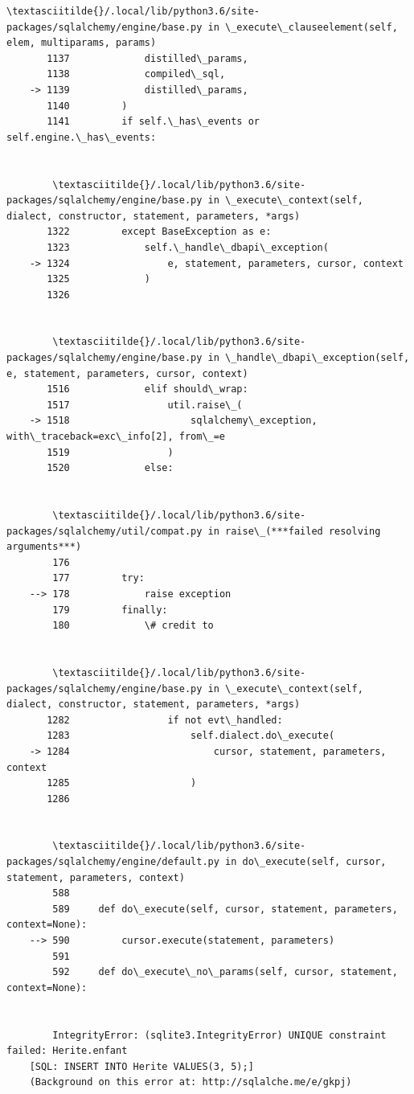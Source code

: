 \documentclass[11pt]{article}
\begin{document}
\begin{Verbatim}[commandchars=\\\{\}]
        \textasciitilde{}/.local/lib/python3.6/site-packages/sqlalchemy/engine/base.py in \_execute\_clauseelement(self, elem, multiparams, params)
       1137             distilled\_params,
       1138             compiled\_sql,
    -> 1139             distilled\_params,
       1140         )
       1141         if self.\_has\_events or self.engine.\_has\_events:


        \textasciitilde{}/.local/lib/python3.6/site-packages/sqlalchemy/engine/base.py in \_execute\_context(self, dialect, constructor, statement, parameters, *args)
       1322         except BaseException as e:
       1323             self.\_handle\_dbapi\_exception(
    -> 1324                 e, statement, parameters, cursor, context
       1325             )
       1326 


        \textasciitilde{}/.local/lib/python3.6/site-packages/sqlalchemy/engine/base.py in \_handle\_dbapi\_exception(self, e, statement, parameters, cursor, context)
       1516             elif should\_wrap:
       1517                 util.raise\_(
    -> 1518                     sqlalchemy\_exception, with\_traceback=exc\_info[2], from\_=e
       1519                 )
       1520             else:


        \textasciitilde{}/.local/lib/python3.6/site-packages/sqlalchemy/util/compat.py in raise\_(***failed resolving arguments***)
        176 
        177         try:
    --> 178             raise exception
        179         finally:
        180             \# credit to


        \textasciitilde{}/.local/lib/python3.6/site-packages/sqlalchemy/engine/base.py in \_execute\_context(self, dialect, constructor, statement, parameters, *args)
       1282                 if not evt\_handled:
       1283                     self.dialect.do\_execute(
    -> 1284                         cursor, statement, parameters, context
       1285                     )
       1286 


        \textasciitilde{}/.local/lib/python3.6/site-packages/sqlalchemy/engine/default.py in do\_execute(self, cursor, statement, parameters, context)
        588 
        589     def do\_execute(self, cursor, statement, parameters, context=None):
    --> 590         cursor.execute(statement, parameters)
        591 
        592     def do\_execute\_no\_params(self, cursor, statement, context=None):


        IntegrityError: (sqlite3.IntegrityError) UNIQUE constraint failed: Herite.enfant
    [SQL: INSERT INTO Herite VALUES(3, 5);]
    (Background on this error at: http://sqlalche.me/e/gkpj)

    \end{Verbatim}
\end{document}
